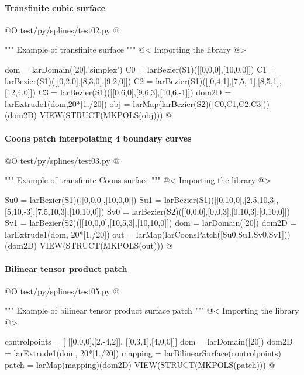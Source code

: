 \documentclass[11pt,oneside]{article}	%
\begin{document}
\paragraph{Transfinite cubic surface}

@O test/py/splines/test02.py  
@{""" Example of transfinite surface """
@< Importing the library @>

dom = larDomain([20],'simplex')
C0 = larBezier(S1)([[0,0,0],[10,0,0]])
C1 = larBezier(S1)([[0,2,0],[8,3,0],[9,2,0]])
C2 = larBezier(S1)([[0,4,1],[7,5,-1],[8,5,1],[12,4,0]])
C3 = larBezier(S1)([[0,6,0],[9,6,3],[10,6,-1]])
dom2D = larExtrude1(dom,20*[1./20])
obj = larMap(larBezier(S2)([C0,C1,C2,C3]))(dom2D)
VIEW(STRUCT(MKPOLS(obj)))
@}

\paragraph{Coons patch interpolating 4 boundary curves}

@O test/py/splines/test03.py  
@{""" Example of transfinite Coons surface """
@< Importing the library @>

Su0 = larBezier(S1)([[0,0,0],[10,0,0]])
Su1 = larBezier(S1)([[0,10,0],[2.5,10,3],[5,10,-3],[7.5,10,3],[10,10,0]])
Sv0 = larBezier(S2)([[0,0,0],[0,0,3],[0,10,3],[0,10,0]])
Sv1 = larBezier(S2)([[10,0,0],[10,5,3],[10,10,0]])
dom = larDomain([20])
dom2D = larExtrude1(dom, 20*[1./20])
out = larMap(larCoonsPatch([Su0,Su1,Sv0,Sv1]))(dom2D)
VIEW(STRUCT(MKPOLS(out)))
@}


\paragraph{Bilinear tensor product patch}


@O test/py/splines/test05.py
@{""" Example of bilinear tensor product surface patch """
@< Importing the library @>

controlpoints = [
	[[0,0,0],[2,-4,2]],
	[[0,3,1],[4,0,0]]]
dom = larDomain([20])
dom2D = larExtrude1(dom, 20*[1./20])
mapping = larBilinearSurface(controlpoints)
patch = larMap(mapping)(dom2D)
VIEW(STRUCT(MKPOLS(patch)))
@}
\end{document}
